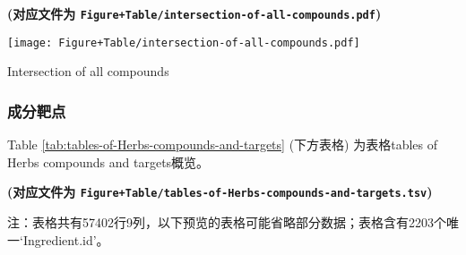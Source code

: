 \documentclass[
]{article}
\begin{document}
\textbf{(对应文件为 \texttt{Figure+Table/intersection-of-all-compounds.pdf})}

\def\@captype{figure}
\begin{center}
\texttt{[image: Figure+Table/intersection-of-all-compounds.pdf]}
\caption{Intersection of all compounds}\label{fig:intersection-of-all-compounds}
\end{center}

\hypertarget{ux6210ux5206ux9776ux70b9}{%
\subsubsection{成分靶点}\label{ux6210ux5206ux9776ux70b9}}

Table \ref{tab:tables-of-Herbs-compounds-and-targets} (下方表格) 为表格tables of Herbs compounds and targets概览。

\textbf{(对应文件为 \texttt{Figure+Table/tables-of-Herbs-compounds-and-targets.tsv})}

\begin{center}\begin{tcolorbox}[colback=gray!10, colframe=gray!50, width=0.9\linewidth, arc=1mm, boxrule=0.5pt]注：表格共有57402行9列，以下预览的表格可能省略部分数据；表格含有2203个唯一`Ingredient.id'。
\end{tcolorbox}
\end{center}
\end{document}

